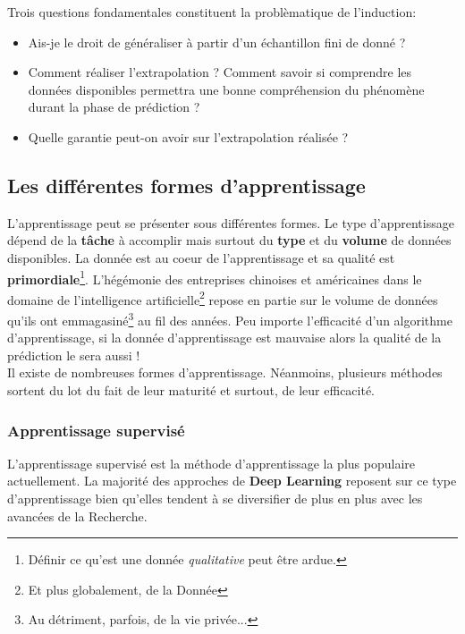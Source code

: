 \noindent Trois questions fondamentales constituent la problèmatique de l'induction:
\begin{itemize}
    \item Ais-je le droit de généraliser à partir d'un échantillon fini de donné ?
    \item Comment réaliser l'extrapolation ? Comment savoir si comprendre les données disponibles permettra une bonne compréhension du phénomène durant la phase de prédiction ?
    \item Quelle garantie peut-on avoir sur l'extrapolation réalisée ?
\end{itemize}

\subsection{Les différentes formes d'apprentissage}

\noindent L'apprentissage peut se présenter sous différentes formes. Le type d'apprentissage dépend de la \textbf{tâche} à accomplir mais surtout du \textbf{type} et du \textbf{volume} de données disponibles. La donnée est au coeur de l'apprentissage et sa qualité est \textbf{primordiale}\footnote{Définir ce qu'est une donnée \textit{qualitative} peut être ardue.}. L'hégémonie des entreprises chinoises et américaines dans le domaine de l'intelligence artificielle\footnote{Et plus globalement, de la Donnée} repose en partie sur le volume de données qu'ils ont emmagasiné\footnote{Au détriment, parfois, de la vie privée...} au fil des années. Peu importe l'efficacité d'un algorithme d'apprentissage, si la donnée d'apprentissage est mauvaise alors la qualité de la prédiction le sera aussi !\\

\noindent Il existe de nombreuses formes d'apprentissage. Néanmoins, plusieurs méthodes sortent du lot du fait de leur maturité et surtout, de leur efficacité.

\subsubsection{Apprentissage supervisé}

\noindent L'apprentissage supervisé est la méthode d'apprentissage la plus populaire actuellement. La majorité des approches de \textbf{Deep Learning} reposent sur ce type d'apprentissage bien qu'elles tendent à se diversifier de plus en plus avec les avancées de la Recherche.\\

